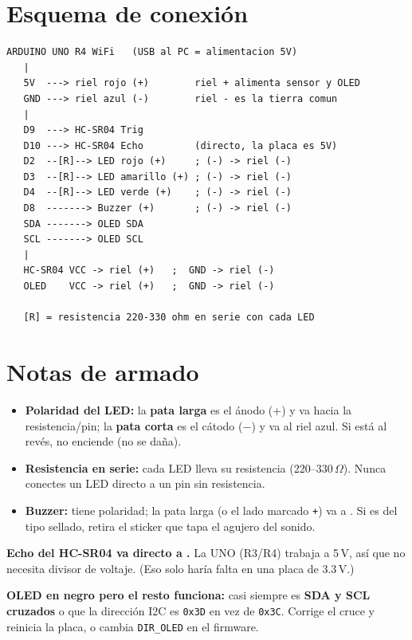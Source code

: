 \documentclass[10pt,letterpaper]{article}
\newcommand{\pin}[1]{\tcbox[on line, colback=AIEPInk, colframe=AIEPInk, boxrule=0pt,
  arc=0.7mm, left=1.4mm, right=1.4mm, top=0.3mm, bottom=0.3mm]%
  {\footnotesize\bfseries\textcolor{white}{\texttt{#1}}}}
\begin{document}
\section{Esquema de conexión}
\begin{lstlisting}[style=plano]
   ARDUINO UNO R4 WiFi   (USB al PC = alimentacion 5V)
   |
   5V  ---> riel rojo (+)        riel + alimenta sensor y OLED
   GND ---> riel azul (-)        riel - es la tierra comun
   |
   D9  ---> HC-SR04 Trig
   D10 ---> HC-SR04 Echo         (directo, la placa es 5V)
   D2  --[R]--> LED rojo (+)     ; (-) -> riel (-)
   D3  --[R]--> LED amarillo (+) ; (-) -> riel (-)
   D4  --[R]--> LED verde (+)    ; (-) -> riel (-)
   D8  -------> Buzzer (+)       ; (-) -> riel (-)
   SDA -------> OLED SDA
   SCL -------> OLED SCL
   |
   HC-SR04 VCC -> riel (+)   ;  GND -> riel (-)
   OLED    VCC -> riel (+)   ;  GND -> riel (-)

   [R] = resistencia 220-330 ohm en serie con cada LED
\end{lstlisting}

\section{Notas de armado}
\begin{itemize}
\item \textbf{Polaridad del LED:} la \textbf{pata larga} es el ánodo (+) y va hacia la
resistencia/pin; la \textbf{pata corta} es el cátodo ($-$) y va al riel azul. Si está al revés,
no enciende (no se daña).
\item \textbf{Resistencia en serie:} cada LED lleva su resistencia (220--330\,$\Omega$). Nunca
conectes un LED directo a un pin sin resistencia.
\item \textbf{Buzzer:} tiene polaridad; la pata larga (o el lado marcado \texttt{+}) va a
\pin{D8}. Si es del tipo sellado, retira el sticker que tapa el agujero del sonido.
\end{itemize}

\begin{ojo}
\textbf{Echo del HC-SR04 va directo a \pin{D10}.} La UNO (R3/R4) trabaja a 5\,V, así que no
necesita divisor de voltaje. (Eso solo haría falta en una placa de 3.3\,V.)
\end{ojo}

\begin{ojo}
\textbf{OLED en negro pero el resto funciona:} casi siempre es \textbf{SDA y SCL cruzados} o que
la dirección I2C es \texttt{0x3D} en vez de \texttt{0x3C}. Corrige el cruce y reinicia la placa,
o cambia \texttt{DIR\_OLED} en el firmware.
\end{ojo}
\end{document}
